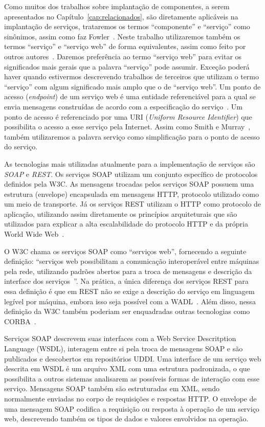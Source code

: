 Como muitos dos trabalhos sobre implantação de componentes, a serem apresentados no Capítulo~\ref{cap:relacionados}, são diretamente aplicáveis na implantação de serviços, trataremos os termos ``componente'' e ``serviço'' como sinônimos, assim como faz Fowler~\cite{Fowler2004Inversion}. Neste trabalho utilizaremos também os termos ``serviço'' e ``serviço web'' de forma equivalentes, assim como feito por outros autores~\cite{Watson2006Dynasoar}. Daremos preferência ao termo ``serviço web'' para evitar os significados mais gerais que a palavra ``serviço'' pode assumir. Exceção poderá haver quando estivermos descrevendo trabalhos de terceiros que utilizam o termo ``serviço'' com algum significado mais amplo que o de ``serviço web''. Um ponto de acesso (\textit{endpoint}) de um serviço web é uma entidade referenciável para a qual se envia mensagens construídas de acordo com a especificação do serviço~\cite{W3C2004Addressing}. Um ponto de acesso é referenciado por uma URI (\emph{Uniform Resource Identifier}) que possibilita o acesso a esse serviço pela Internet. Assim como Smith e Murray~\cite{Smith2010Evolution}, também utilizaremos a palavra serviço como simplificação para o ponto de acesso do serviço. 

As tecnologias mais utilizadas atualmente para a implementação de serviços são \emph{SOAP} e \emph{REST}. Os serviços SOAP utilizam um conjunto específico de protocolos definidos pela W3C. As mensagens trocadas pelos serviços SOAP possuem uma estrutura (envelope) encapsulada em mensagens HTTP, protocolo utilizado como um meio de transporte. Já os serviços REST utilizam o HTTP como protocolo de aplicação, utilizando assim diretamente os princípios arquiteturais que são utilizados para explicar a alta escalabilidade do protocolo HTTP e da própria World Wide Web~\cite{Pautasso2008Restful}. 

O W3C chama os serviços SOAP como ``serviços web'', fornecendo a seguinte definição: ``serviços web possibilitam a comunicação interoperável entre máquinas pela rede, utilizando padrões abertos para a troca de mensagens e descrição da interface dos serviços~\cite{W3C2004WS}''. Na prática, a única diferença dos serviços REST para essa definição é que em REST não se exige a descrição do serviço em linguagem legível por máquina, embora isso seja possível com a WADL~\cite{WADL2006}. Além disso, nessa definição da W3C também poderiam ser enquadradas outras tecnologias como CORBA~\cite{CORBA1995}. 

Serviços SOAP descrevem suas interfaces com a Web Service Descritption Language (WSDL), interagem entre si pela troca de mensagens SOAP e são publicados e descobertos em repositórios UDDI. Uma interface de um serviço web descrita em WSDL é um arquivo XML com uma estrutura padronizada, o que possibilita a outros sistemas analisarem as possíveis formas de interação com esse serviço. Mensagens SOAP também são estruturadas em XML, sendo normalmente enviadas no corpo de requisições e respostas HTTP. O envelope de uma mensagem SOAP codifica a requisição ou resposta à operação de um serviço web, descrevendo também os tipos de dados e valores envolvidos na operação. 

